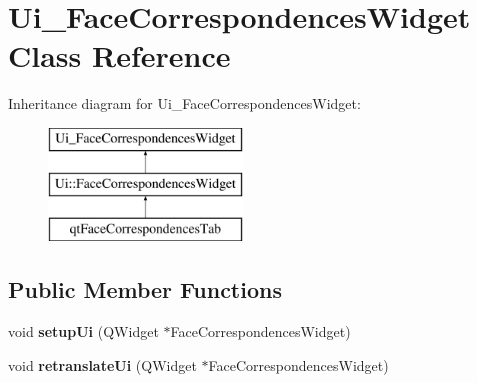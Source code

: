 \hypertarget{class_ui___face_correspondences_widget}{}\section{Ui\+\_\+\+Face\+Correspondences\+Widget Class Reference}
\label{class_ui___face_correspondences_widget}
Inheritance diagram for Ui\+\_\+\+Face\+Correspondences\+Widget\+:\begin{figure}[H]
\begin{center}
\leavevmode
\includegraphics[height=3.000000cm]{class_ui___face_correspondences_widget}
\end{center}
\end{figure}
\subsection*{Public Member Functions}
\begin{DoxyCompactItemize}
\item 
\hypertarget{class_ui___face_correspondences_widget_a608852c3c034c62061323ee0d538261b}{}void {\bfseries setup\+Ui} (Q\+Widget $\ast$Face\+Correspondences\+Widget)\label{class_ui___face_correspondences_widget_a608852c3c034c62061323ee0d538261b}

\item 
\hypertarget{class_ui___face_correspondences_widget_af1895345bf63270f8b1f09908819fca5}{}void {\bfseries retranslate\+Ui} (Q\+Widget $\ast$Face\+Correspondences\+Widget)\label{class_ui___face_correspondences_widget_af1895345bf63270f8b1f09908819fca5}

\end{DoxyCompactItemize}

